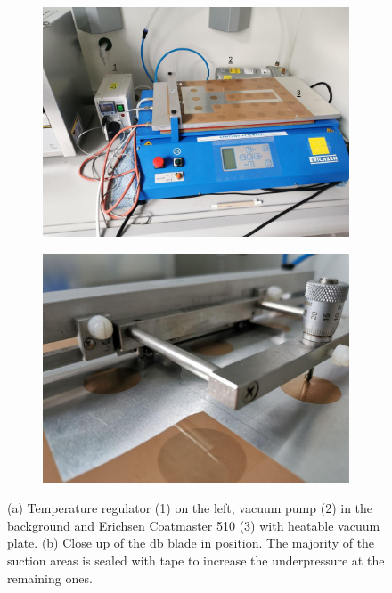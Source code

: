\documentclass[a4paper]{article}
\begin{document}
\begin{figure}
	\centering
	\begin{subfigure}{.49\textwidth}
		\centering
		\includegraphics[width=.99\textwidth]{Pics/erichsen1.png}
		\caption{}
	\end{subfigure}
	\begin{subfigure}{.49\textwidth}
		\centering
		\includegraphics[width=.99\textwidth]{Pics/erichsendb1.png}
		\caption{}
	\end{subfigure}
	\caption{
		(a)
		Temperature regulator (1) on the left,
		vacuum pump (2) in the background and 
		Erichsen Coatmaster 510 (3) with heatable vacuum plate.
		(b) Close up of the \gls{db} blade in position.
		The majority of the suction areas is sealed with tape to increase the underpressure at the remaining ones.
	}
	\label{fig:eric}
\end{figure}
\end{document}
